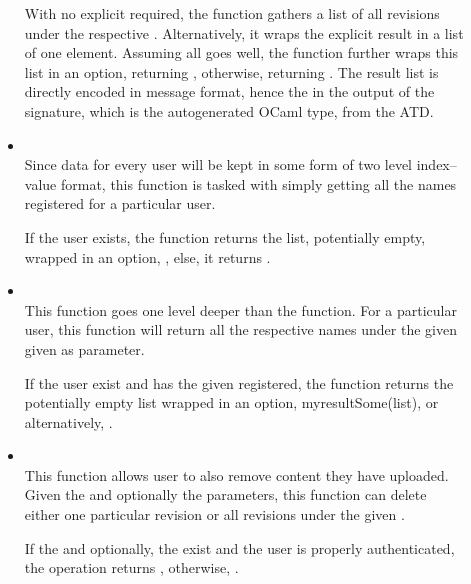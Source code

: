 \begin{description}
\begin{itemize}
  With no explicit  required, the function gathers a list of all revisions under the respective . Alternatively, it wraps the explicit result in a list of one element. Assuming all goes well, the function further wraps this list in an option, returning , otherwise, returning . The result list is directly encoded in message format, hence the  in the output of the signature, which is the autogenerated OCaml type, from the ATD.

  \item {} \\
  Since data for every user will be kept in some form of two level index--value format, this function is tasked with simply getting all the  names registered for a particular user.

  If the user exists, the function returns the list, potentially empty, wrapped in an option, , else, it returns .

  \item {} \\
  This function goes one level deeper than the  function.
  For a particular user, this function will return all the respective  names under the given  given as parameter.

  If the user exist and has the given  registered, the function returns the potentially empty list wrapped in an option, myresult{Some(list)}, or alternatively, .

  \item {} \\
  This function allows user to also remove content they have uploaded.
  Given the  and optionally the  parameters, this function can delete either one particular revision or all revisions under the given .

  If the  and optionally, the  exist and the user is properly authenticated, the operation returns , otherwise, .


\end{itemize}
\end{description}
